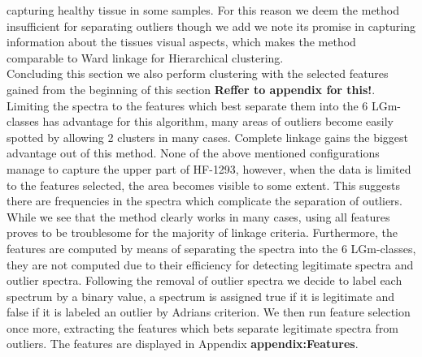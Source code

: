capturing healthy tissue in some samples. For this reason we deem the method insufficient for separating outliers though we add we note its promise in capturing information about the tissues visual aspects, which makes the method comparable to Ward linkage for Hierarchical clustering.
\\

Concluding this section we also perform clustering with the selected features gained from the beginning of this section \textbf{Reffer to appendix for this!}. Limiting the spectra to the features which best separate them into the 6 LGm-classes has advantage for this algorithm, many areas of outliers become easily spotted by allowing 2 clusters in many cases. Complete linkage gains the biggest advantage out of this method. None of the above mentioned configurations manage to capture the upper part of HF-1293, however, when the data is limited to the features selected, the area becomes visible to some extent. This suggests there are frequencies in the spectra which complicate the separation of outliers. While we see that the method clearly works in many cases, using all features proves to be troublesome for the majority of linkage criteria. Furthermore, the features are computed by means of separating the spectra into the 6 LGm-classes, they are not computed due to their efficiency for detecting legitimate spectra and outlier spectra. Following the removal of outlier spectra we decide to label each spectrum by a binary value, a spectrum is assigned true if it is legitimate and false if it is labeled an outlier by Adrians criterion. We then run feature selection once more, extracting the features which bets separate legitimate spectra from outliers. The features are displayed in Appendix \textbf{appendix:Features}.